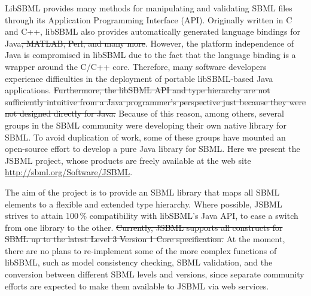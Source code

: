 \documentclass{bioinfo}
\begin{document}
LibSBML provides many methods for manipulating and validating
SBML files through its Application Programming Interface (API).
Originally written in C and C++, libSBML also provides automatically generated 
language bindings for Java\texttrademark\sout{, MATLAB\texttrademark, Perl, and
many more}. However, the platform independence of Java is compromised
in libSBML due to the fact that the language binding is a
wrapper around the C/C++ core. 
Therefore, many software developers experience difficulties in
the deployment of portable libSBML-based Java applications.
\sout{Furthermore, the libSBML API and type hierarchy are not sufficiently
intuitive from a Java programmer's perspective just because they were not
designed directly for Java.}
Because of this reason, among others, several groups in the SBML community
were developing their own native library for SBML. To avoid duplication of
work, some of these groups have mounted an open-source effort to
develop a pure Java library for SBML. Here we present the JSBML
project, whose products are freely available at the web site
\href{http://sbml.org/Software/JSBML}{http://sbml.org/Software/JSBML}.

The aim of the project is to provide an SBML
library that maps all SBML elements to a flexible and extended
type hierarchy. Where possible, JSBML strives to attain
100\,\% compatibility with libSBML's Java API, to ease a switch from
one library to the other.\sout{ Currently, JSBML supports all constructs
for SBML up to the latest Level 3 Version 1 Core specification.} At the moment,
there are no plans to re-implement some of the more complex functions of
libSBML, such as model consistency checking, SBML validation,
and the conversion between different SBML levels and versions,
since separate community efforts are expected to make them
available to JSBML via web services.

\end{document}
